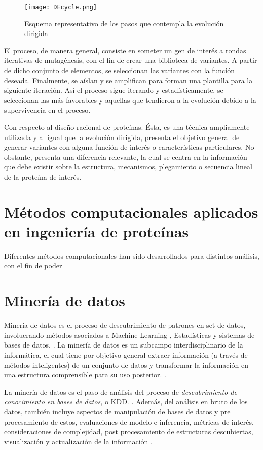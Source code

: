 \begin{figure}[!h]
	
	\centering
	\texttt{[image: DEcycle.png]}
	\caption{Esquema representativo de los pasos que contempla la evolución dirigida}
	\label{ed}
\end{figure}

El proceso, de manera general, consiste en someter un gen de interés a rondas iterativas de mutagénesis, con el fin de crear una biblioteca de variantes. A partir de dicho conjunto de elementos, se seleccionan las variantes con la función deseada. Finalmente, se aíslan y se amplifican para forman una plantilla para la siguiente iteración. Así el proceso sigue iterando y estadísticamente, se seleccionan las más favorables y aquellas que tendieron a la evolución debido a la supervivencia en el proceso.

Con respecto al diseño racional de proteínas. Ésta, es una técnica ampliamente utilizada y al igual que la evolución dirigida, presenta el objetivo general de generar variantes con alguna función de interés o características particulares. No obstante, presenta una diferencia relevante, la cual se centra en la información que debe existir sobre la estructura, mecanismos, plegamiento o secuencia lineal de la proteína de interés.

\section{Métodos computacionales aplicados en ingeniería de proteínas}

Diferentes métodos computacionales han sido desarrollados para distintos análisis, con el fin de poder 

\section{Minería de datos}


Minería de datos es el proceso de descubrimiento de patrones en set de datos, involucrando métodos asociados a Machine Learning \cite{michie1994machine}, Estadísticas y sistemas de bases de datos. \cite{hand2006data}. La minería de datos es un subcampo interdisciplinario de la informática, el cual tiene por objetivo general extraer información (a través de métodos inteligentes) de un conjunto de datos y transformar la información en una estructura comprensible para su uso posterior. \cite{fayyad1996knowledge, dunham2006data}. 

La minería de datos es el paso de análisis del proceso de \textit{descubrimiento de conocimiento en bases de datos}, o KDD. \cite{fayyad1996kdd}. Además, del análisis en bruto de los datos, también incluye aspectos de manipulación de bases de datos y pre procesamiento de estos, evaluaciones de modelo e inferencia, métricas de interés, consideraciones de complejidad, post procesamiento de estructuras descubiertas, visualización y actualización de la información \cite{berry2004data}.

